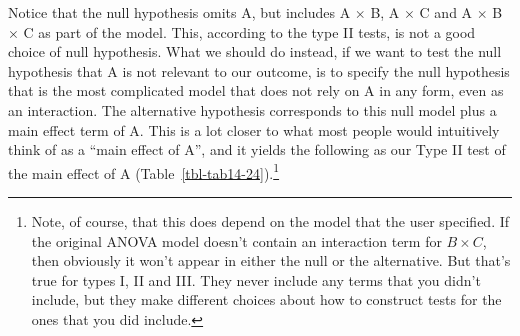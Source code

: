 \documentclass[
  a4paper,
]{book}
\begin{document}
Notice that the null hypothesis omits A, but includes A \(\times\) B, A
\(\times\) C and A \(\times\) B \(\times\) C as part of the model. This,
according to the type II tests, is not a good choice of null hypothesis.
What we should do instead, if we want to test the null hypothesis that A
is not relevant to our outcome, is to specify the null hypothesis that
is the most complicated model that does not rely on A in any form, even
as an interaction. The alternative hypothesis corresponds to this null
model plus a main effect term of A. This is a lot closer to what most
people would intuitively think of as a ``main effect of A'', and it
yields the following as our Type II test of the main effect of A
(Table~\ref{tbl-tab14-24}).\footnote{Note, of course, that this does
  depend on the model that the user specified. If the original ANOVA
  model doesn't contain an interaction term for \(B \times C\), then
  obviously it won't appear in either the null or the alternative. But
  that's true for types I, II and III. They never include any terms that
  you didn't include, but they make different choices about how to
  construct tests for the ones that you did include.}

\hypertarget{tbl-tab14-24}{}
 
  \providecommand{\huxb}[2]{\arrayrulecolor[RGB]{#1}\global\arrayrulewidth=#2pt}
  \providecommand{\huxvb}[2]{\color[RGB]{#1}\vrule width #2pt}
  \providecommand{\huxtpad}[1]{\rule{0pt}{#1}}
  \providecommand{\huxbpad}[1]{\rule[-#1]{0pt}{#1}}
\end{document}
